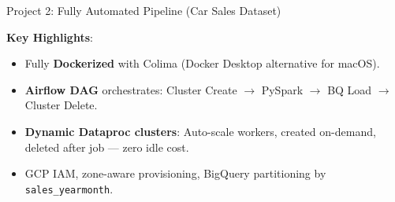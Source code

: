 \documentclass{beamer}
\begin{document}
\begin{frame}[shrink=10]{Project 2: Fully Automated Pipeline (Car Sales Dataset)}
\begin{center}
{
  }
  \end{center}
  
  \vspace{0.1cm}
  \textbf{Key Highlights}:
  \begin{itemize}
    \item[\textcolor{TealGreen}{\faDocker}] Fully \textbf{Dockerized} with Colima (Docker Desktop alternative for macOS).
    \item[\textcolor{DeepBlue}{\faClock}] \textbf{Airflow DAG} orchestrates: Cluster Create $\rightarrow$ PySpark $\rightarrow$ BQ Load $\rightarrow$ Cluster Delete.
    \item[\textcolor{VividOrange}{\faExpandArrowsAlt}] \textbf{Dynamic Dataproc clusters}: Auto-scale workers, created on-demand, deleted after job --- zero idle cost.
    \item[\textcolor{RakutenCrimson}{\faShieldAlt}] GCP IAM, zone-aware provisioning, BigQuery partitioning by \texttt{sales\_yearmonth}.
  \end{itemize}
\end{frame}
\end{document}
